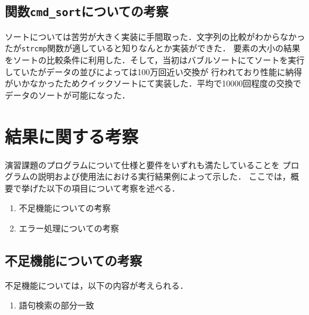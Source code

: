 \documentclass[a4j,11pt]{jarticle}
\begin{document}
\subsection{関数\texttt{cmd\_sort}についての考察}
ソートについては苦労が大きく実装に手間取った．文字列の比較がわからなかったが\verb|strcmp|関数が適していると知りなんとか実装ができた．
要素の大小の結果をソートの比較条件に利用した．そして，当初はバブルソートにてソートを実行していたがデータの並びによっては100万回近い交換が
行われており性能に納得がいかなかったためクイックソートにて実装した．平均で10000回程度の交換でデータのソートが可能になった．

\section{結果に関する考察}


演習課題のプログラムについて仕様と要件をいずれも満たしていることを
プログラムの説明および使用法における実行結果例によって示した．
ここでは，概要で挙げた以下の項目について考察を述べる．

\begin{enumerate}
\setlength{\parskip}{2pt} \setlength{\itemsep}{2pt}
    \item 不足機能についての考察
    \item エラー処理についての考察
\end{enumerate}

\subsection{不足機能についての考察}
不足機能については，以下の内容が考えられる．
\begin{enumerate}
\setlength{\parskip}{2pt} \setlength{\itemsep}{2pt}
　　\item 語句検索の部分一致
\end{enumerate}
\end{document}

